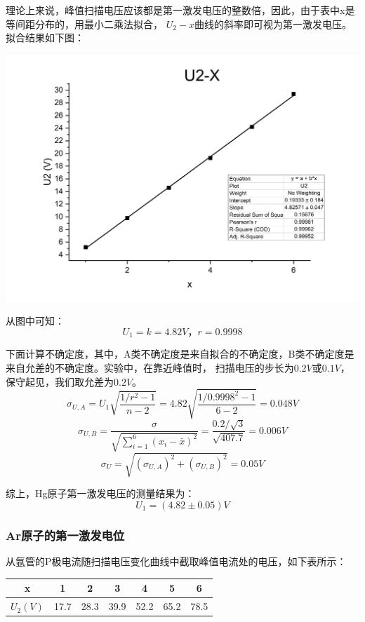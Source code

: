 \documentclass{article}
\begin{document}
    理论上来说，峰值扫描电压应该都是第一激发电压的整数倍，因此，由于表中x是等间距分布的，用最小二乘法拟合，
    $U_2-x$曲线的斜率即可视为第一激发电压。拟合结果如下图：

    \begin{center}
        \includegraphics[width=\textwidth]{Hg activate.jpg}
    \end{center}

    从图中可知：
    $$U_1=k=4.82V，r=0.9998$$

    下面计算不确定度，其中，A类不确定度是来自拟合的不确定度，B类不确定度是来自允差的不确定度。实验中，在靠近峰值时，
    扫描电压的步长为$0.2V$或$0.1V$，保守起见，我们取允差为$0.2V$。
    $$\sigma_{U,A}=U_1\sqrt{\frac{1/r^2-1}{n-2}}=4.82\sqrt{\frac{1/0.9998^2-1}{6-2}}=0.048V$$
    $$\sigma_{U,B}=\frac{\sigma}{\sqrt{\sum_{i=1}^6 (x_i-\bar{x})^2}}=\frac{0.2/\sqrt{3}}{\sqrt{407.7}}=0.006V$$
    $$\sigma_{U}=\sqrt{(\sigma_{U,A})^2+(\sigma_{U,B})^2}=0.05V$$

    综上，Hg原子第一激发电压的测量结果为：
    $$U_1=(4.82\pm 0.05)V$$

    \subsubsection{Ar原子的第一激发电位}
    从氩管的P极电流随扫描电压变化曲线中截取峰值电流处的电压，如下表所示：

    \begin{center}
        \begin{tabular}{|c|c|c|c|c|c|c|}
            \hline
            x     & 1     & 2     & 3     & 4     & 5     & 6  \bigstrut\\
            \hline
            $U_2(V)$ & 17.7  & 28.3  & 39.9  & 52.2  & 65.2  & 78.5  \bigstrut\\
            \hline
        \end{tabular}%
    \end{center}
\end{document}
